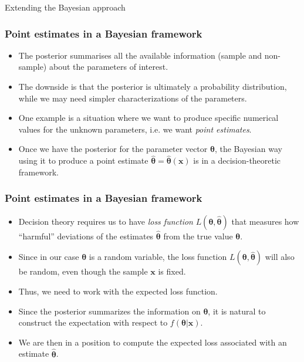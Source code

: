 \documentclass[10pt]{beamer}
\theoremstyle{definition}
\begin{document}
\begin{section}{Extending the Bayesian approach}
\begin{frame}[fragile]
\frametitle{Point estimates in a Bayesian framework}
\begin{itemize}\itemsep1em
\item The posterior summarises all the available information (sample and non-sample) about the parameters of interest.
\item The downside is that the posterior is ultimately a probability distribution, while we may need simpler characterizations of the parameters.
\item One example is a situation where we want to produce specific numerical values for the unknown parameters, i.e. we want \emph{point estimates}.
\item Once we have the posterior for the parameter vector $\boldsymbol{\theta}$, the Bayesian way using it to produce a point estimate $\boldsymbol{\hat{\theta}}=\boldsymbol{\hat{\theta}}(\mathbf{x})$ is in a decision-theoretic framework.
\end{itemize}
\end{frame}

\begin{frame}[fragile]
\frametitle{Point estimates in a Bayesian framework}
\begin{itemize}\itemsep1em
\item Decision theory requires us to have \emph{loss function} $L(\boldsymbol{\theta},\boldsymbol{\hat{\theta}})$ that measures how ``harmful'' deviations of the estimates $\boldsymbol{\hat{\theta}}$ from the true value $\boldsymbol{\theta}$. 
\item Since in our case $\boldsymbol{\theta}$ is a random variable, the loss function $L(\boldsymbol{\theta},\boldsymbol{\hat{\theta}})$ will also be random, even though the sample $\mathbf{x}$ is fixed.
\item Thus, we need to work with the expected loss function.
\item Since the posterior summarizes the information on $\boldsymbol{\theta}$, it is natural to construct the expectation with respect to $ f(\boldsymbol{\theta}|\mathbf{x}) $.
\item We are then in a position to compute the expected loss associated with an estimate $\boldsymbol{\hat{\theta}}$.
\end{itemize}
\end{frame}


\end{section}
\end{document}
